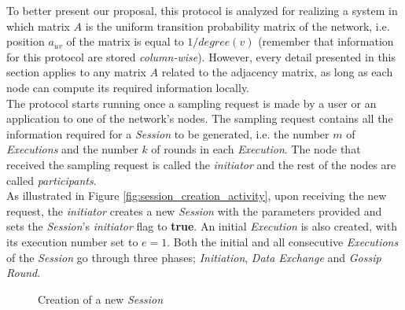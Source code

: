 \documentclass[a4paper,11pt,twoside]{report}
\begin{document}
To better present our proposal, this protocol is analyzed for realizing a system in which matrix $A$ is the uniform transition probability matrix of the network, i.e. position $a_{uv}$ of the matrix is equal to $1/degree(v)$ (remember that information for this protocol are stored \textit{column-wise}).  However, every detail presented in this section applies to any matrix $A$ related to the adjacency matrix, as long as each node can compute its required information locally.\\


The protocol starts running once a sampling request is made by a user or an application to one of the network's nodes. The sampling request contains all the information required for a \textit{Session} to be generated, i.e. the number $m$ of \textit{Executions} and the number $k$ of rounds in each \textit{Execution}. The node that received the sampling request is called the \textit{initiator} and the rest of the nodes are called \textit{participants}.\\


As illustrated in Figure \ref{fig:session_creation_activity}, upon receiving the new request, the \textit{initiator} creates a new \textit{Session} with the parameters provided and sets the \textit{Session}'s \textit{initiator} flag to {\bf true}. An initial \textit{Execution} is also created, with its execution number set to $e=1$. Both the initial and all consecutive \textit{Executions} of the \textit{Session} go through three phases; \textit{Initiation}, \textit{Data Exchange} and \textit{Gossip Round}.

\begin{figure}[h]
\centering
{}\hfill
{}
\caption{Creation of a new \textit{Session}}
\label{fig:session_creation}
\end{figure}
\end{document}
